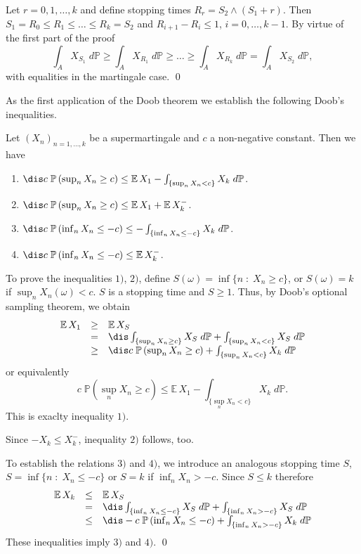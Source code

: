 \documentclass[preprint]{imsart}
\def\P{\mathbb P}
\def\E{\mathbb E}
\begin{document}
{Let $r=0,1,\ldots ,k$ and define stopping times $R_r=S_2\wedge
(S_1+r)$. Then $S_1=R_0\leq R_1\le \ldots\le R_k=S_2$ and
$R_{i+1}-R_i\le 1$, $i=0,\ldots,k-1$. By virtue of the first part
of the proof
$$
\int_AX_{S_1}\; d\P\ge \int_AX_{R_1}\; d\P\ge \ldots
\ge \int_AX_{R_k}\; d\P=\int_AX_{S_2}\; d\P,
$$
with equalities in the martingale case. \qed


As the first application of the Doob theorem we establish the
following Doob's inequalities.


\begin{Theorem}\label{doobineq}
  Let $(X_n)_{n=1,\ldots ,k}$ be a supermartingale
  and $c$ a non-negative constant. Then we have
  \begin{enumerate}
\item[1)]
$\dis c\; \P\left(\sup_{ n}X_n\ge c\right)\le \E\,
X_1-\int_{\{\sup_{n}X_n< c\}}X_k\; d\P$.
\item[2)]
$\dis c\; \P\left(\sup_{ n}X_n\ge c\right)\le \E\,
X_1+\E\, X_k^-$.
\item[3)]
$\dis c\; \P\left(\inf_{ n}X_n\le - c\right)\le
-\int_{\{\inf_{n}X_n\le - c\}}X_k\; d\P$.
\item[4)]
$\dis c\; \P\left(\inf_{ n}X_n\le - c\right)\le
\E\, X_k^-$.
  \end{enumerate}
\end{Theorem}

To prove the inequalities $1)$, $2)$, define
$S(\omega)=\inf\{n\;:\; X_n\geq c\}$, or $S(\omega)=k$ if
$\sup_nX_n(\omega)<c$. $S$ is a stopping time and $S\ge 1$. Thus,
by Doob's optional sampling theorem, we obtain
$$
\begin{array}{lll}
\E\, X_1&\ge& \E\, X_S
\\&=&\dis
\int_{\{\sup_{n}X_n\ge  c\}}X_S\; d\P+
\int_{\{\sup_{n}X_n< c\}}X_S\; d\P
\\&\ge&\dis
c\; \P\left(\sup_{n}X_n\ge  c\right) +
\int_{\{\sup_{n}X_n< c\}}X_k\; d\P
\end{array}
$$
or equivalently
$$
c\; \P\left(\sup_{n}X_n\ge  c\right) \le \E\, X_1-
\int_{\{\sup_{n}X_n< c\}}X_k\; d\P.
$$
This is exaclty inequality $1)$.

Since $-X_k\le X_k^-$, inequality $2)$ follows, too.

To establish the relations $3)$ and $4)$, we introduce an
analogous stopping time $S$, $S= \inf\{n\;:\; X_n\leq -c\}$
 or $S=k$ if $\inf_nX_n>-c$. Since $S\le k$ therefore
 $$
\begin{array}{lll}
\E\, X_k&\le& \E\, X_S
\\&=&\dis
\int_{\{\inf_{n}X_n\le - c\}}X_S\; d\P+
\int_{\{\inf_{n}X_n>-c\}}X_S\; d\P
\\&\le&\dis
-c\; \P\left(\inf_{n}X_n\le - c\right) +
\int_{\{\inf_{n}X_n>-c\}}X_k\; d\P
\end{array}
$$
These inequalities imply $3)$ and $4)$.
\qed


}
\end{document}
